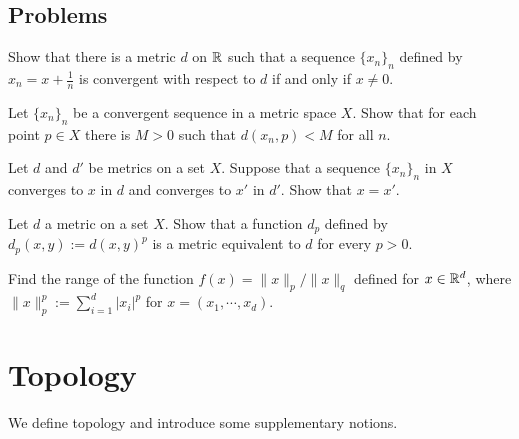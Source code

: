 \documentclass{../crs}
\begin{document}
\subsection*{Problems}
\begin{prb}
Show that there is a metric $d$ on $\mathbb{R}$ such that a sequence $\{x_n\}_n$ defined by $x_n=x+\frac1n$ is convergent with respect to $d$ if and only if $x\ne0$.
\end{prb}
\begin{prb}
Let $\{x_n\}_n$ be a convergent sequence in a metric space $X$.
Show that for each point $p\in X$ there is $M>0$ such that $d(x_n,p)<M$ for all $n$.
\end{prb}
\begin{prb}
Let $d$ and $d'$ be metrics on a set $X$.
Suppose that a sequence $\{x_n\}_n$ in $X$ converges to $x$ in $d$ and converges to $x'$ in $d'$.
Show that $x=x'$.
\end{prb}
\begin{prb}
Let $d$ a metric on a set $X$.
Show that a function $d_p$ defined by $d_p(x,y):=d(x,y)^p$ is a metric equivalent to $d$ for every $p>0$.
\end{prb}
\begin{prb}
Find the range of the function $f(x)=\|x\|_p/\|x\|_q$ defined for $x\in\mathbb{R}^d$, where $\|x\|_p^p:=\sum_{i=1}^d|x_i|^p$ for $x=(x_1,\cdots,x_d)$.
\end{prb}






















\section{Topology}
We define topology and introduce some supplementary notions.




\end{document}

